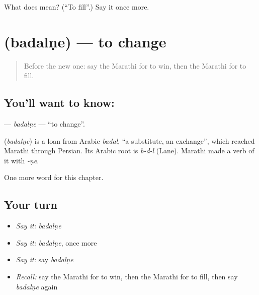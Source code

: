 \begin{tcolorbox}[breakable,colback=teal!4,colframe=teal!35!black,title={Before you move on}]
What does  mean? (\textquotedblleft{}To fill\textquotedblright{}.) Say it once more.
\end{tcolorbox}
\section[\texorpdfstring{\mr{बदलणे} (badalṇe)}{बदलणे (badalṇe)}]{ (badalṇe) — to change}

\label{lesson:MR-C84-badalne}



\begin{quote}
Before the new one: say the Marathi for to win, then the Marathi for to fill.
\end{quote}

\subsection*{You'll want to know: }
\textbf{} — \emph{badalṇe} — \textquotedblleft{}to change\textquotedblright{}.

\begin{cousinweb}
\textbf{} (\emph{badalṇe}) is a loan from Arabic \emph{badal}, \textquotedblleft{}a substitute, an exchange\textquotedblright{}, which reached Marathi through Persian. Its Arabic root is \emph{b-d-l} (Lane). Marathi made a verb of it with \emph{-ṇe}.
\end{cousinweb}

\begin{grammarlens}[title={What you've built}]
One more word for this chapter.
\end{grammarlens}

\subsection*{Your turn}
\begin{itemize}
\raggedright
  \item \emph{Say it:} \emph{badalṇe}
  \item \emph{Say it:} \emph{badalṇe}, once more
  \item \emph{Say it:} say \emph{badalṇe}
  \item \emph{Recall:} say the Marathi for to win, then the Marathi for to fill, then say \emph{badalṇe} again
\end{itemize}


